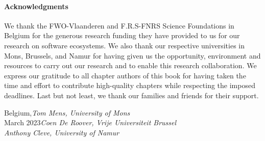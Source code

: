 \paragraph{\textbf{Acknowledgments}}
We thank the FWO-Vlaanderen and F.R.S-FNRS Science Foundations in Belgium for the generous research funding they have provided to us for our research on software ecosystems. We also thank our respective universities in Mons, Brussels, and Namur for having given us the opportunity, environment and resources to carry out our research and to enable this research collaboration. We express our gratitude to all chapter authors of this book for having taken the time and effort to contribute high-quality chapters while respecting the imposed deadlines. Last but not least, we thank our families and friends for their support.

\vspace{\baselineskip}
\begin{flushright}\noindent
    Belgium,\hfill {\it Tom  Mens, University of Mons}\\
    March 2023\hfill {\it Coen  De Roover, Vrije Universiteit Brussel}\\
    \hfill {\it Anthony  Cleve, University of Namur}\\

\end{flushright}


